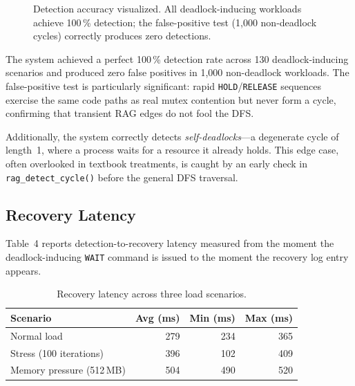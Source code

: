 \documentclass[11pt,letterpaper]{article}
\begin{document}
\begin{figure}[h]
\centering
{}
\caption{Detection accuracy visualized.  All deadlock-inducing workloads
  achieve 100\,\% detection; the false-positive test (1,000 non-deadlock
  cycles) correctly produces zero detections.}
\label{fig:detection-accuracy}
\end{figure}

The system achieved a perfect 100\,\% detection rate across 130
deadlock-inducing scenarios and produced zero false positives in 1,000
non-deadlock workloads.  The false-positive test is particularly
significant: rapid \texttt{HOLD}/\texttt{RELEASE} sequences exercise
the same code paths as real mutex contention but never form a cycle,
confirming that transient RAG edges do not fool the DFS.

Additionally, the system correctly detects
\emph{self-deadlocks}---a degenerate cycle of length~1, where a
process waits for a resource it already holds.  This edge case, often
overlooked in textbook treatments, is caught by an early check in
\texttt{rag\_detect\_cycle()} before the general DFS traversal.

\subsection{Recovery Latency}

Table~4 reports detection-to-recovery latency measured from the moment
the deadlock-inducing \texttt{WAIT} command is issued to the moment the
recovery log entry appears.

\begin{table}[h]
\centering
\begin{tabular}{lrrr}
\toprule
\textbf{Scenario} & \textbf{Avg (ms)} & \textbf{Min (ms)} & \textbf{Max (ms)} \\
\midrule
Normal load & 279 & 234 & 365 \\
Stress (100 iterations) & 396 & 102 & 409 \\
Memory pressure (512\,MB) & 504 & 490 & 520 \\
\bottomrule
\end{tabular}
\caption{Recovery latency across three load scenarios.}
\end{table}
\end{document}
